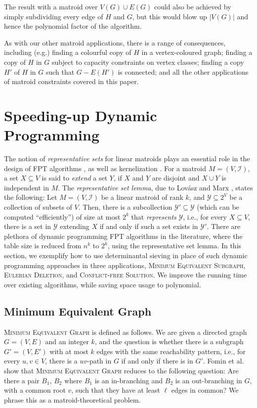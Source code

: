 \documentclass{theoretics}
\newcommand{\cI}{\ensuremath{\mathcal I}\xspace}
\begin{document}
The result with a matroid over $V(G) \cup E(G)$ could also be achieved
by simply subdividing every edge of $H$ and $G$, but this would blow
up $|V(G)|$ and hence the polynomial factor of the algorithm.

As with our other matroid applications, there is a range of
consequences, including (e.g.) finding a colourful copy of $H$
in a vertex-coloured graph; finding a copy of $H$ in $G$ subject to
capacity constraints on vertex classes; finding a copy $H'$ of $H$ in
$G$ such that $G-E(H')$ is connected; and all the other applications
of matroid constraints covered in this paper.


\section{Speeding-up Dynamic Programming}
\label{sec:noDP}

The notion of \emph{representative sets} for linear matroids plays an essential role in the design of FPT algorithms \cite{FominLPS16JACM,FominLPS17}, as well as kernelization \cite{KratschW20JACM}.
For a matroid $M = (V, \cI)$, a set $X \subseteq V$ is said to \emph{extend} a set $Y$, if $X$ and $Y$ are disjoint and $X \cup Y$ is independent in $M$.
The \emph{representative set lemma}, due to Lov\'asz \cite{Lovasz1977} and Marx \cite{Marx09-matroid}, states the following:
Let $M = (V, \cI)$ be a linear matroid of rank $k$, and $\mathcal Y \subseteq 2^V$ be a collection of subsets of $V$.
Then, there is a subcollection $\mathcal Y' \subseteq \mathcal Y$ (which can be computed ``efficiently'') of size at most $2^k$ that \emph{represents} $\mathcal Y$, i.e., for every $X \subseteq V$, there is a set in $\mathcal Y$ extending $X$ if and only if such a set exists in $\mathcal Y'$.
There are plethora of dynamic programming FPT algorithms in the literature, where the table size is reduced from $n^k$ to $2^k$, using the representative set lemma.
In this section, we exemplify how to use determinantal sieving in place of such dynamic programming approaches in three applications, \textsc{Minimum Equivalent Subgraph}, \textsc{Eulerian Deletion}, and \textsc{Conflict-free Solution}.
We improve the running time over existing algorithms, while saving space usage to polynomial.

\subsection{Minimum Equivalent Graph}

\textsc{Minimum Equivalent Graph} is defined as follows.
We are given a directed graph $G = (V, E)$ and an integer $k$, and the question is whether there is a subgraph $G' = (V, E')$ with at most $k$ edges with the same reachability pattern, i.e., for every $u, v \in V$, there is a $uv$-path in $G$ if and only if there is in $G'$.
Fomin et al.~\cite{FominLPS16JACM} show that \textsc{Minimum
  Equivalent Graph} reduces to the following question:
Are there a pair $B_1$, $B_2$ where $B_1$ is an in-branching
and $B_2$ is an out-branching in $G$, with a common root $v$,
such that they have at least $\ell$ edges in common? 
We phrase this as a matroid-theoretical problem. 
\end{document}
